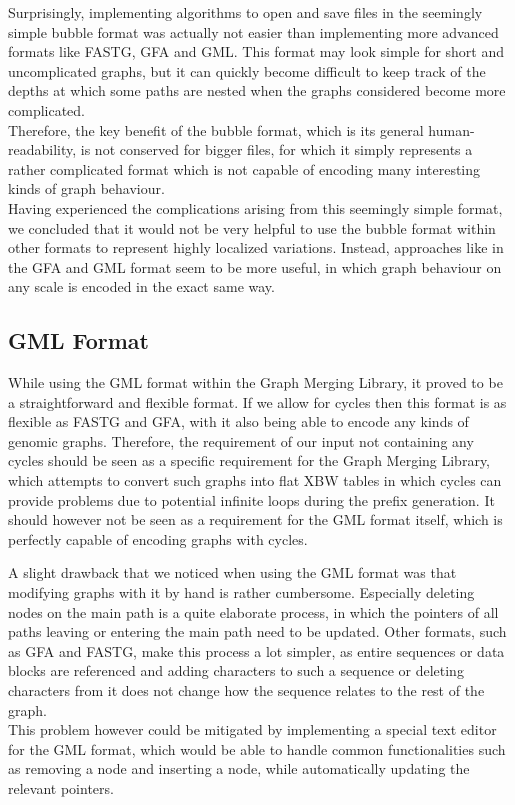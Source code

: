 \documentclass[a4paper,12pt,twoside,BCOR=10mm]{scrbook}
\begin{document}
Surprisingly, implementing algorithms to open and save files in the seemingly simple bubble format was actually
not easier than implementing more advanced formats like FASTG, GFA and GML.
This format may look simple for short and uncomplicated graphs,
but it can quickly become difficult to keep track of the depths at which some paths
are nested when the graphs considered become more complicated. \\
Therefore, the key benefit of the bubble format, which is its general human-readability,
is not conserved for bigger files, for which it simply represents a rather complicated format
which is not capable of encoding many interesting kinds of graph behaviour. \\
Having experienced the complications arising from this seemingly simple format,
we concluded that it would not be very helpful to use the bubble format within
other formats to represent highly localized variations.
Instead, approaches like in the GFA and GML format seem to be more useful,
in which graph behaviour on any scale is encoded in the exact same way.

\subsection{GML Format}

While using the GML format within the Graph Merging Library,
it proved to be a straightforward and flexible format.
If we allow for cycles then this format is as flexible as FASTG and GFA,
with it also being able to encode any kinds of genomic graphs.
Therefore, the requirement of our input not containing any cycles should be
seen as a specific requirement for the Graph Merging Library, which attempts
to convert such graphs into flat XBW tables in which cycles can provide problems
due to potential infinite loops during the prefix generation.
It should however not be seen as a requirement for the GML format itself,
which is perfectly capable of encoding graphs with cycles.

A slight drawback that we noticed when using the GML format was that
modifying graphs with it by hand is rather cumbersome.
Especially deleting nodes on the main path is a quite elaborate process,
in which the pointers of all paths leaving or entering the main path
need to be updated.
Other formats, such as GFA and FASTG, make this process a lot simpler,
as entire sequences or data blocks are referenced and adding characters to such a
sequence or deleting characters from it does not change how the sequence
relates to the rest of the graph. \\
This problem however could be mitigated by implementing a special text editor
for the GML format, which would be able to handle common functionalities such as
removing a node and inserting a node, while automatically updating the relevant pointers.
\end{document}
